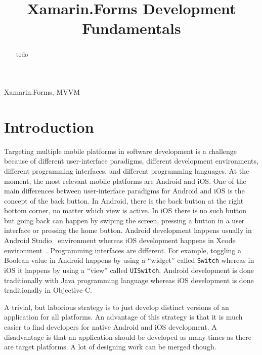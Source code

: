 \documentclass[conference]{IEEEtran}
\begin{document}
\title{Xamarin.Forms Development Fundamentals}

\author{
}

\maketitle

\begin{abstract}
  todo
\end{abstract}

\begin{IEEEkeywords}
  Xamarin.Forms, MVVM
\end{IEEEkeywords}

\section{Introduction}

Targeting multiple mobile platforms in software development is a challenge because of different user-interface paradigms, different development environments, different programming interfaces, and different programming languages. At the moment, the most relevant mobile platforms are Android and iOS. One of the main differences between user-interface paradigms for Android and iOS is the concept of the back button. In Android, there is the back button at the right bottom corner, no matter which view is active. In iOS there is no such button but going back can happen by swiping the screen, pressing a button in a user interface or pressing the home button. Android development happens usually in Android Studio~\cite{androidstudio} environment whereas iOS development happens in Xcode environment~\cite{xcode}. Programming interfaces are different. For example, toggling a Boolean value in Android happens by using a ``widget'' called \texttt{Switch} whereas in iOS it happens by using a ``view'' called \texttt{UISwitch}. Android development is done traditionally with Java programming language whereas iOS development is done traditionally in Objective-C.

A trivial, but laborious strategy is to just develop distinct versions of an application for all platforms. An advantage of this strategy is that it is much easier to find developers for native Android and iOS development. A disadvantage is that an application should be developed as many times as there are target platforms. A lot of designing work can be merged though.
\end{document}
